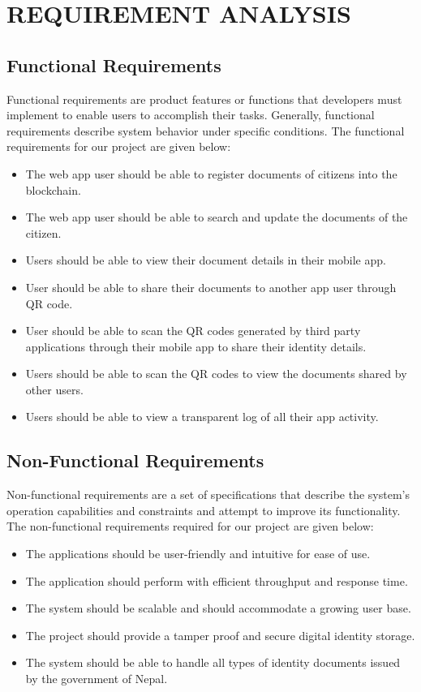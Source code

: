 \chapter{REQUIREMENT ANALYSIS}
\section{Functional Requirements}
Functional requirements are product features or functions that developers must implement to enable users to accomplish their tasks. Generally, functional requirements describe system behavior under specific conditions. The functional requirements for our project are given below:
\begin{itemize}[itemsep=-4pt, topsep=-8pt]
    \item The web app user should be able to register documents of citizens into the blockchain.
    \item The web app user should be able to search and update the documents of the citizen. 
    \item Users should be able to view their document details in their mobile app.
    \item User should be able to share their documents to another app user through QR code.
    \item User should be able to scan the QR codes generated by third party applications through their mobile app to share their identity details.
    \item Users should be able to scan the QR codes to view the documents shared by other users.
    \item Users should be able to view a transparent log of all their app activity.
\end{itemize}

\section{Non-Functional Requirements}
Non-functional requirements are a set of specifications that describe the system's operation capabilities and constraints and attempt to improve its functionality. The non-functional requirements required for our project are given below:
\begin{itemize}[itemsep=-4pt, topsep=-8pt]
\item The applications should be user-friendly and intuitive for ease of use. 
\item The application should perform with efficient throughput and response time.
\item The system should be scalable and should accommodate a growing user base.
\item The project should provide a tamper proof and secure digital identity storage.
\item The system should be able to handle all types of identity documents issued by the government of Nepal.

\end{itemize}


